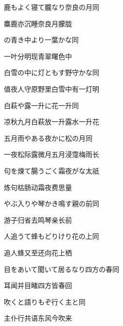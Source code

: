 \begin{haiku}
    {\FH 鹿もよく寝て朧なり奈良の月}\hfill{\FH 同}

    {\FK 麋鹿亦沉睡奈良月朦胧}
\end{haiku}

\begin{haiku}
    {\FH {}の青き中より一葉かな}\hfill{\FH 同}

    {\FK 一叶分明现青翠曙色中}
\end{haiku}

\begin{haiku}
    {\FH 白雪の中に灯ともす野守かな}\hfill{\FH 同}

    {\FK 值夜人守原野里白雪中有一灯明}
\end{haiku}

\begin{haiku}
    {\FH 白萩や露一升に花一升}\hfill{\FH 同}

    {\FK 凉秋九月白萩放一升露水一升花}
\end{haiku}

\begin{haiku}
    {\FH 五月雨やある夜かに松の月}\hfill{\FH 同}

    {\FK 一夜松际露微月五月浸霪梅雨长}
\end{haiku}

\begin{haiku}
    {\FH 句を煉て腸うごく霜夜がな}\hfill{\FH 太祇}

    {\FK 炼句枯肠动霜夜费思量}
\end{haiku}

\begin{haiku}
    {\FH やぶ入りや琴かき鳴す親の前}\hfill{\FH 同}

    {\FK 游子归省去鸣琴亲长前}
\end{haiku}

\begin{haiku}
    {\FH 人追うて蜂もどりけり花の上}\hfill{\FH 同}

    {\FK 追人蜂又至还向花上栖}
\end{haiku}

\begin{haiku}
    {\FH 目をあいて聞いて居るなり四方の春}\hfill{\FH 同}

    {\FK 耳闻并目睹四方皆春回}
\end{haiku}

\begin{haiku}
    {\FH {}吹くと語りもぞ行く主と}\hfill{\FH 同}

    {\FK 主仆行共语东风今吹来}
\end{haiku}

